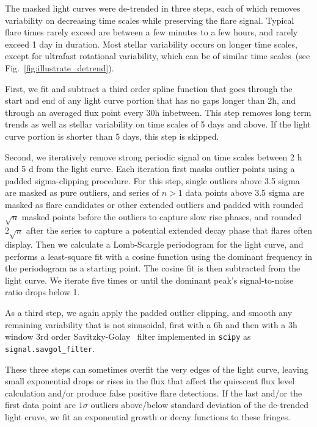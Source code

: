 \documentclass[fleqn,usenatbib,letters]{mnras}%
\begin{document}
The masked light curves were de-trended in three steps, each of which removes variability on decreasing time scales while preserving the flare signal. Typical flare times rarely exceed are between a few minutes to a few hours, and rarely exceed 1 day in duration. Most stellar variability occurs on longer time scales, except for ultrafast rotational variability, which can be of similar time scales~(see Fig.~\ref{fig:illustrate_detrend}). 

First, we fit and subtract a third order spline function that goes through the start and end of any light curve portion that has no gaps longer than 2h, and through an averaged flux point every 30h inbetween. This step removes long term trends as well as stellar variability on time scales of 5 days and above. If the light curve portion is shorter than 5 days, this step is skipped. 

Second, we iteratively remove strong periodic signal on time scales between 2 h and 5 d from the light curve. Each iteration first masks outlier points using a padded sigma-clipping procedure. For this step, single outliers above 3.5 sigma are masked as pure outliers, and series of $n>1$ data points above 3.5 sigma are masked as flare candidates or other extended outliers and padded with rounded $\sqrt{n}$ masked points before the outliers to capture slow rise phases, and rounded $2\sqrt{n}$ after the series to capture a potential extended decay phase that flares often display. Then we calculate a Lomb-Scargle periodogram for the light curve, and performs a least-square fit with a cosine function using the dominant frequency in the periodogram as a starting point. The cosine fit is then subtracted from the light curve. We iterate five times or until the dominant peak's signal-to-noise ratio drops below 1. 

As a third step, we again apply the padded outlier clipping, and smooth any remaining variability that is not sinusoidal, first with a 6h and then with a 3h window 3rd order Savitzky-Golay~\citep{savitzky1964} filter implemented in \texttt{scipy} as \texttt{signal.savgol\_filter}.

These three steps can sometimes overfit the very edges of the light curve, leaving small exponential drops or rises in the flux that affect the quiescent flux level calculation and/or produce false positive flare detections. If the last and/or the first data point are $1\sigma$ outliers above/below standard deviation of the de-trended light cruve, we fit an exponential growth or decay functions to these fringes.
\end{document}
